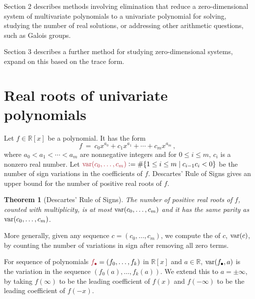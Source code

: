 \documentclass[12pt]{amsart}
\newtheorem{theorem}{Theorem}
\theoremstyle{definition}
\newcommand{\RR}{\mathbb{R}}
\DeclareMathOperator{\var}{{\rm var}}
\newcommand{\defcolor}[1]{{\color{Maroon}#1}}
\newcommand{\demph}[1]{\defcolor{{\sl #1}}}
\begin{document}
Section 2 describes methods involving elimination that reduce a zero-dimensional system of multivariate polynomials to a univariate
polynomial for solving, studying the number of real solutions, or addressing other arithmetic questions, such as Galois groups.

Section 3 describes a further method for studying zero-dimensional systems, {\color{red}expand on this} based on the trace form.


\section{Real roots of univariate polynomials}

Let $f\in\RR[x]$ be a polynomial.
It has the form
%
 \[
   f\ =\ c_{0}x^{a_{0}} + c_{1}x^{a_{1}} + \cdots + c_{m}x^{a_{m}}\,,
 \]
%
where $a_{0} < a_{1} < \cdots < a_{m}$ are nonnegative integers and for $0\leq i \leq m$, $c_{i}$ is a nonzero real number.
Let $\defcolor{\var(c_0,\dotsc,c_m)}\vcentcolon=\#\{1\leq i\leq m\mid c_{i-1}c_i<0\}$ be the number of sign variations in the coefficients
of $f$.
Descartes' Rule of Signs \cite{So_Book} gives an upper bound for the number of positive real roots of $f$.

\begin{theorem}[Descartes' Rule of Signs]
  The number of positive real roots of $f$, counted with multiplicity, is at most $\var(c_0,\dotsc,c_m)$ and it has the same parity
  as $\var(c_0,\dotsc,c_m)$.
\end{theorem}

More generally, given any sequence $c=(c_0,\dotsc,c_m)$, we compute the \demph{variation} of $c$, $\var(c)$, by counting the number of
variations in sign after removing all zero terms.
%
\begin{leftbar}

\end{leftbar}
%
For sequence of polynomials  $\defcolor{f_\bullet}=(f_0,\dotsc,f_k)$ in $\RR[x]$ and $a\in\RR$, \defcolor{$\var(f_\bullet,a)$} is the
variation in the sequence 
$(f_0(a),\dotsc,f_{k}(a))$. 
We extend this to $a=\pm\infty$, by taking $f(\infty)$ to be the leading coefficient of $f(x)$ and $f(-\infty)$ to be the leading
coefficient of $f(-x)$.
\end{document}

